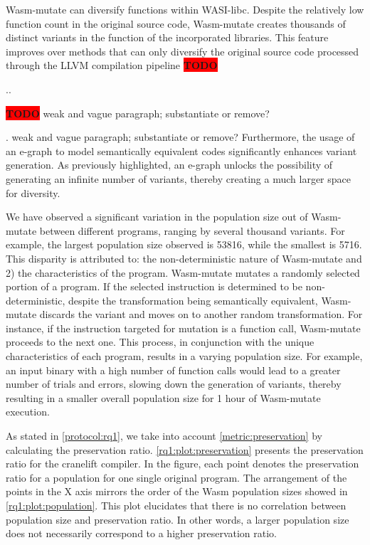 \documentclass[sigplan,screen]{acmart}
\newcommand*\badge[1]{ \colorbox{red}{\color{white}#1}}
\newcommand{\tool}{Wasm-mutate\xspace}
\newcommand{\wasm}{Wasm\xspace}
\newcommand{\todo}[1]{%
\refstepcounter{todo}
\noindent\textbf{\badge{TODO}} {\color{red}#1}
\addcontentsline{td}{todo}
{\color{red}\thesection.\thetodo\xspace #1}}
\begin{document}
\tool can diversify functions within WASI-libc. 
Despite the relatively low function count in the original source code,  \tool creates thousands of distinct variants in the function of the incorporated libraries. 
This feature improves over methods that can only diversify the original source code processed through the LLVM compilation pipeline \todo{\cite{XXX}}. 

\todo{weak and vague paragraph; substantiate or remove?}
Furthermore, the usage of an e-graph to model semantically equivalent codes significantly enhances variant generation. 
As previously highlighted, an e-graph unlocks the possibility of generating an infinite number of variants, thereby creating a much larger space for diversity.


We have observed a significant variation in the population size out of \tool between different programs, ranging by several thousand variants. 
For example, the largest population size observed is 53816, while the smallest is 5716.
This disparity is attributed to:
the non-deterministic nature of \tool and 2) the characteristics of the program. 
\tool mutates a randomly selected portion of a program. 
If the selected instruction is determined to be non-deterministic, despite the transformation being semantically equivalent, \tool discards the variant and moves on to another random transformation.
For instance, if the instruction targeted for mutation is a function call, \tool proceeds to the next one.
This process, in conjunction with the unique characteristics of each program, results in a varying population size. 
For example, an input binary with a high number of function calls would lead to a greater number of trials and errors, slowing down the generation of variants, thereby resulting in a smaller overall population size for 1 hour of \tool execution.

As stated in \autoref{protocol:rq1}, we take into account \autoref{metric:preservation} by calculating the preservation ratio. 
\autoref{rq1:plot:preservation} presents the preservation ratio for the cranelift compiler. 
In the figure, each point denotes the preservation ratio for a population for one single original program.
The arrangement of the points in the X axis mirrors the order of the \wasm population sizes showed in \autoref{rq1:plot:population}. 
This plot elucidates that there is no correlation between population size and preservation ratio. 
In other words, a larger population size does not necessarily correspond to a higher preservation ratio.
\end{document}
